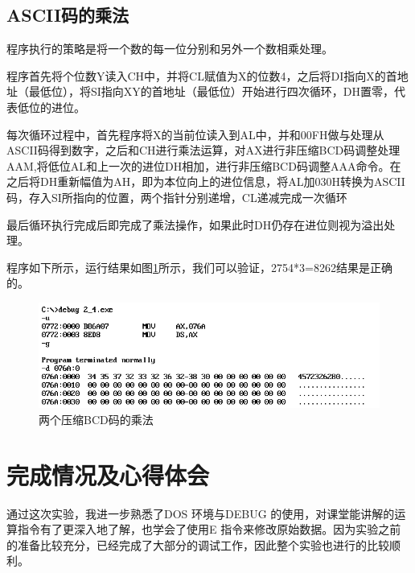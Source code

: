 \documentclass[UTF8,a4paper]{ctexart}
\begin{document}
\subsection{ASCII码的乘法}
程序执行的策略是将一个数的每一位分别和另外一个数相乘处理。

程序首先将个位数Y读入CH中，并将CL赋值为X的位数4，之后将DI指向X的首地址（最低位），将SI指向XY的首地址（最低位）开始进行四次循环，DH置零，代表低位的进位。

每次循环过程中，首先程序将X的当前位读入到AL中，并和00FH做与处理从ASCII码得到数字，之后和CH进行乘法运算，对AX进行非压缩BCD码调整处理AAM,将低位AL和上一次的进位DH相加，进行非压缩BCD码调整AAA命令。在之后将DH重新幅值为AH，即为本位向上的进位信息，将AL加030H转换为ASCII码，存入SI所指向的位置，两个指针分别递增，CL递减完成一次循环

最后循环执行完成后即完成了乘法操作，如果此时DH仍存在进位则视为溢出处理。

程序如下所示，运行结果如图\ref{p221}所示，我们可以验证，2754*3=8262结果是正确的。


\begin{figure}[b]
\centering
\includegraphics[width=\textwidth]{p221.png}
\caption{两个压缩BCD码的乘法}
\label{p221}
\end{figure}
\clearpage
\section{完成情况及心得体会}
通过这次实验，我进一步熟悉了DOS 环境与DEBUG 的使用，对课堂能讲解的运算指令有了更深入地了解，也学会了使用E 指令来修改原始数据。因为实验之前的准备比较充分，已经完成了大部分的调试工作，因此整个实验也进行的比较顺利。
\end{document}
